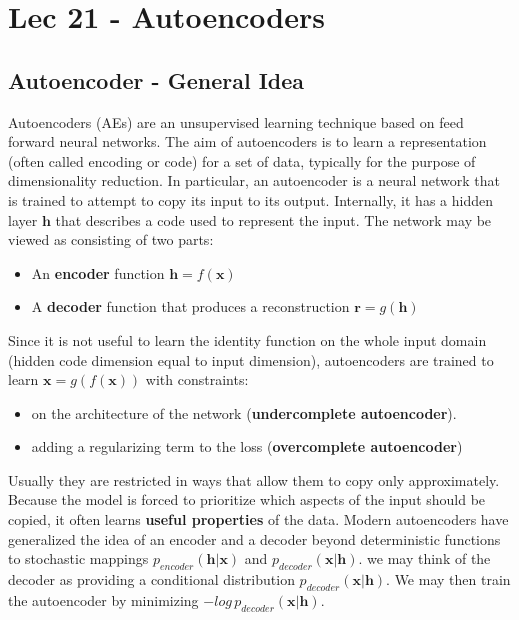 \chapter{Lec 21 - Autoencoders}

\section{Autoencoder - General Idea}
Autoencoders (AEs) are an unsupervised learning technique based on feed forward neural networks. The aim of autoencoders is to learn a representation (often called encoding or code) for a set of data, typically for the purpose of dimensionality reduction.\newline\newline
In particular, an autoencoder is a neural network that is trained to attempt to copy its input to its output.  Internally, it has a hidden layer $\textbf{h}$ that describes a code used to represent the input. The network may be viewed as consisting of two parts:
\begin{itemize}
    \item An \textbf{encoder} function $\textbf{h} = f(\textbf{x})$
    \item A \textbf{decoder} function that produces a reconstruction $\textbf{r} = g(\textbf{h})$
\end{itemize}
Since it is not useful to learn the identity function on the whole input domain (hidden code dimension equal to input dimension), autoencoders are trained to learn $\textbf{x} = g(f(\textbf{x}))$ with constraints:
\begin{itemize}
    \item on the architecture of the network (\textbf{undercomplete autoencoder}).

    \item adding a regularizing term to the loss (\textbf{overcomplete autoencoder})
\end{itemize}
Usually they are restricted in ways that allow them to copy only approximately. Because the model is forced to prioritize which aspects of the input should be copied, it often learns \textbf{useful properties} of the data.\newline\newline
Modern autoencoders have generalized the idea of an encoder and a decoder beyond deterministic functions to stochastic mappings $p_{encoder}(\textbf{h} | \textbf{x})$ and $p_{decoder}(\textbf{x} | \textbf{h})$. we may think of the decoder as providing a conditional distribution $p_{decoder}(\textbf{x} | \textbf{h})$. We may then train the autoencoder by minimizing $-log\, p_{decoder}(\textbf{x}|\textbf{h})$.

